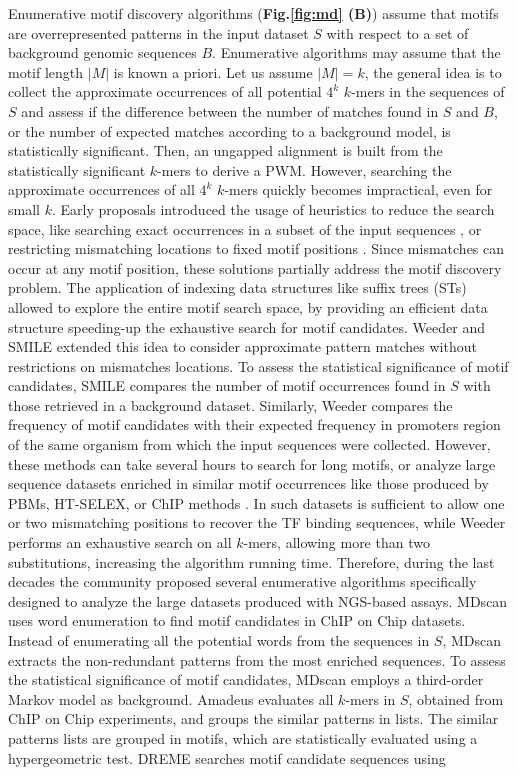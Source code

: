 \documentclass[a4paper, titlepage, 8pt, openright]{book}
\begin{document}
Enumerative motif discovery algorithms (\textbf{Fig.\ref{fig:md} (B)}) assume that motifs are overrepresented patterns in the input dataset $S$ with respect to a set of background genomic sequences $B$. Enumerative algorithms may assume that the motif length $|M|$ is known a priori. Let us assume $|M|=k$, the general idea is to collect the approximate occurrences of all potential $4^{k}$ $k$-mers in the sequences of $S$ and assess if the difference between the number of matches found in $S$ and $B$, or the number of expected matches according to a background model, is statistically significant. Then, an ungapped alignment is built from the statistically significant $k$-mers to derive a PWM. However, searching the approximate occurrences of all $4^{k}$ $k$-mers quickly becomes impractical, even for small $k$. Early proposals introduced the usage of heuristics to reduce the search space, like searching exact occurrences in a subset of the input sequences \citep{li1999finding}, or restricting mismatching locations to fixed motif positions \citep{califano2000splash}. Since mismatches can occur at any motif position, these solutions partially address the motif discovery problem. The application of indexing data structures like suffix trees (STs) \citep{weiner1973linear} allowed to explore the entire motif search space, by providing an efficient data structure speeding-up the exhaustive search for motif candidates. Weeder \citep{pavesi2001algorithm,pavesi2004weeder} and SMILE \citep{marsan2000algorithms} extended this idea to consider approximate pattern matches without restrictions on mismatches locations. To assess the statistical significance of motif candidates, SMILE compares the number of motif occurrences found in $S$ with those retrieved in a background dataset. Similarly, Weeder compares the frequency of motif candidates with their expected frequency in promoters region of the same organism from which the input sequences were collected. However, these methods can take several hours to search for long motifs, or analyze large sequence datasets enriched in similar motif occurrences like those produced by PBMs, HT-SELEX, or ChIP methods \citep{liu2018algorithmic}. In such datasets is sufficient to allow one or two mismatching positions to recover the TF binding sequences, while Weeder performs an exhaustive search on all $k$-mers, allowing more than two substitutions, increasing the algorithm running time. Therefore, during the last decades the community proposed several enumerative algorithms specifically designed to analyze the large datasets produced with NGS-based assays. MDscan \citep{liu2002algorithm} uses word enumeration to find motif candidates in ChIP on Chip datasets. Instead of enumerating all the potential words from the sequences in $S$, MDscan extracts the non-redundant patterns from the most enriched sequences. To assess the statistical significance of motif candidates, MDscan employs a third-order Markov model as background. Amadeus \citep{linhart2008transcription} evaluates all $k$-mers in $S$, obtained from ChIP on Chip experiments, and groups the similar patterns in lists. The similar patterns lists are grouped in motifs, which are statistically evaluated using a hypergeometric test. DREME \citep{bailey2011dreme} searches motif candidate sequences using 
\end{document}

